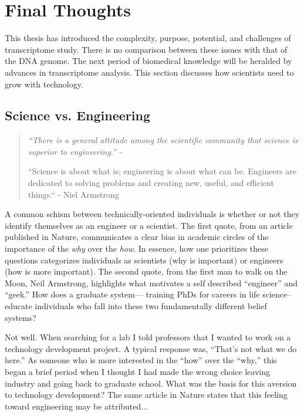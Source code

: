\section{Final Thoughts}
  \label{Disc:sec:Final Thoughts}

  This thesis has introduced the complexity, purpose, potential, and challenges of transcriptome study. There is no comparison between these issues with that of the DNA genome. The next period of biomedical knowledge will be heralded by advances in transcriptome analysis. This section discusses how scientists need to grow with technology.

  \subsection{Science vs. Engineering}
    \label{Disc:subsec:Science and Engineering}

    \begin{quote}
      \itshape 
      \singlespacing
        “There is a general attitude among the scientific community that science is superior to engineering.” - \citep{Macilwain2010}

      “Science is about what is; engineering is about what can be. Engineers are dedicated to solving problems and creating new, useful, and efficient things.“ - Niel Armstrong
      \end{quote}

    A common schism between technically-oriented individuals is whether or not they identify themselves as an engineer or a scientist. The first quote, from an article published in Nature, communicates a clear bias in academic circles of the importance of the \textit{why} over the \textit{how}. In essence, how one prioritizes these questions categorizes individuals as scientists (why is important) or engineers (how is more important). The second quote, from the first man to walk on the Moon, Neil Armstrong, highlights what motivates a self described ``engineer'' and ``geek.'' How does a graduate system--- training PhDs for careers in life science--educate individuals who fall into these two fundamentally different belief systems?

    Not well. When searching for a lab I told professors that I wanted to work on a technology development project. A typical response was, ``That's not what we do here.'' As someone who is more interested in the ``how'' over the ``why,'' this began a brief period when I thought I had made the wrong choice leaving industry and going back to graduate school. What was the basis for this aversion to technology development? The same article in Nature states that this feeling toward engineering may be attributed...

